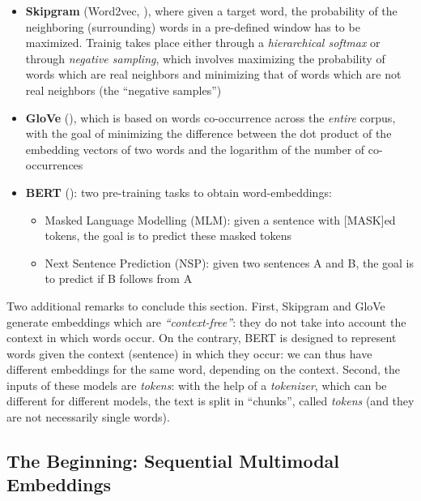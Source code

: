 \documentclass[
]{krantz}
\providecommand{\tightlist}{%
  \setlength{\itemsep}{0pt}\setlength{\parskip}{0pt}}
\begin{document}
\begin{itemize}
\tightlist
\item
  \textbf{Skipgram} (Word2vec, \citet{mikolov2013efficient}), where given a target word, the probability of the neighboring (surrounding) words in a pre-defined window has to be maximized. Trainig takes place either through a \emph{hierarchical softmax} or through \emph{negative sampling}, which involves maximizing the probability of words which are real neighbors and minimizing that of words which are not real neighbors (the ``negative samples'')
\item
  \textbf{GloVe} (\citet{pennington2014glove}), which is based on words co-occurrence across the \emph{entire} corpus, with the goal of minimizing the difference between the dot product of the embedding vectors of two words and the logarithm of the number of co-occurrences
\item
  \textbf{BERT} (\citet{devlin2018bert}): two pre-training tasks to obtain word-embeddings:

  \begin{itemize}
  \tightlist
  \item
    Masked Language Modelling (MLM): given a sentence with {[}MASK{]}ed tokens, the goal is to predict these masked tokens
  \item
    Next Sentence Prediction (NSP): given two sentences A and B, the goal is to predict if B follows from A
  \end{itemize}
\end{itemize}

Two additional remarks to conclude this section. First, Skipgram and GloVe generate embeddings which are \emph{``context-free''}: they do not take into account the context in which words occur. On the contrary, BERT is designed to represent words given the context (sentence) in which they occur: we can thus have different embeddings for the same word, depending on the context.
Second, the inputs of these models are \emph{tokens}: with the help of a \emph{tokenizer}, which can be different for different models, the text is split in ``chunks'', called \emph{tokens} (and they are not necessarily single words).

\hypertarget{the-beginning-sequential-multimodal-embeddings}{%
\subsection{The Beginning: Sequential Multimodal Embeddings}\label{the-beginning-sequential-multimodal-embeddings}}
\end{document}
